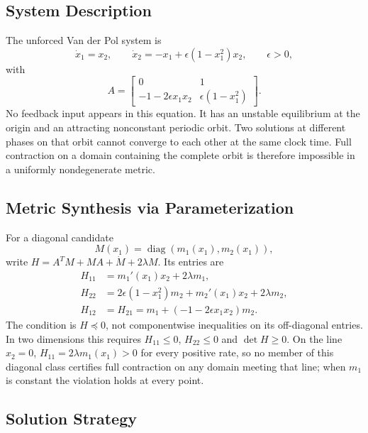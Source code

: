 \subsection{System Description}

The unforced Van der Pol system is
\begin{equation}
\dot x_1=x_2,\qquad\dot x_2=-x_1+\epsilon(1-x_1^2)x_2,\qquad\epsilon>0,
\label{eq:ch4:vdp-system}
\end{equation}
with
\begin{equation}
A=\begin{bmatrix}0&1\\-1-2\epsilon x_1x_2&\epsilon(1-x_1^2)\end{bmatrix}.
\label{eq:ch4:vdp-jacobian}
\end{equation}
No feedback input appears in this equation. It has an unstable equilibrium at the origin and an attracting nonconstant periodic orbit. Two solutions at different phases on that orbit cannot converge to each other at the same clock time. Full contraction on a domain containing the complete orbit is therefore impossible in a uniformly nondegenerate metric.

\subsection{Metric Synthesis via Parameterization}

For a diagonal candidate
\begin{equation}
M(x_1)=\operatorname{diag}(m_1(x_1),m_2(x_1)),
\label{eq:ch4:vdp-metric-ansatz}
\end{equation}
write $H=A^TM+MA+\dot M+2\lambda M$. Its entries are
\begin{align}
H_{11}&=m_1'(x_1)x_2+2\lambda m_1,\label{eq:ch4:vdp-cc-11}\\
H_{22}&=2\epsilon(1-x_1^2)m_2+m_2'(x_1)x_2+2\lambda m_2,\label{eq:ch4:vdp-cc-22}\\
H_{12}&=H_{21}=m_1+(-1-2\epsilon x_1x_2)m_2.\label{eq:ch4:vdp-cc-12}
\end{align}
The condition is $H\preceq0$, not componentwise inequalities on its off-diagonal entries. In two dimensions this requires $H_{11}\leq0$, $H_{22}\leq0$ and $\det H\geq0$. On the line $x_2=0$, $H_{11}=2\lambda m_1(x_1)>0$ for every positive rate, so no member of this diagonal class certifies full contraction on any domain meeting that line; when $m_1$ is constant the violation holds at every point.

\subsection{Solution Strategy}

